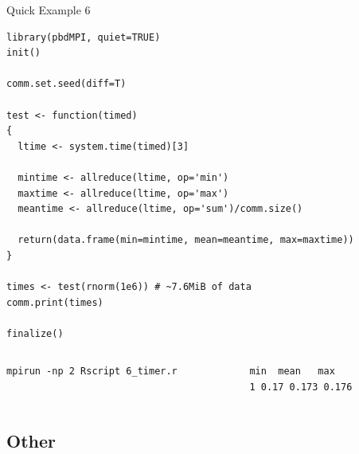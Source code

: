 \begin{frame}
  \begin{exampleblock}{Quick Example 6}
\begin{lstlisting}[title=Timing: 6\_timer.r]
library(pbdMPI, quiet=TRUE)
init()

comm.set.seed(diff=T)

test <- function(timed)
{
  ltime <- system.time(timed)[3]
  
  mintime <- allreduce(ltime, op='min')
  maxtime <- allreduce(ltime, op='max')
  meantime <- allreduce(ltime, op='sum')/comm.size()

  return(data.frame(min=mintime, mean=meantime, max=maxtime))
}

times <- test(rnorm(1e6)) # ~7.6MiB of data
comm.print(times)

finalize()
\end{lstlisting}
  \begin{columns}[t,onlytextwidth]
    \begin{column}{0.58\textwidth}
\begin{lstlisting}[backgroundcolor=\color{white},keywordstyle=\color{black},title=Execute this script via:]
mpirun -np 2 Rscript 6_timer.r
\end{lstlisting}
\end{column}
    \hfill
    \begin{column}{0.35\textwidth}
\begin{lstlisting}[title=Sample Output:]
   min  mean   max
1 0.17 0.173 0.176
\end{lstlisting}
\end{column}
\end{columns}
  \end{exampleblock}
\end{frame}







\subsection{Other}

